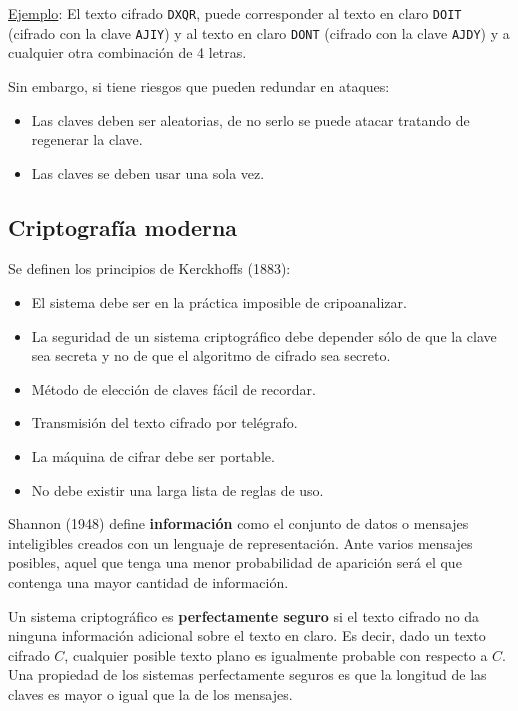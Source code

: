 \underline{Ejemplo}: El texto cifrado \texttt{DXQR}, puede corresponder al texto en claro \texttt{DOIT} (cifrado con la clave \texttt{AJIY}) y al texto en claro \texttt{DONT} (cifrado con la clave \texttt{AJDY}) y a cualquier otra combinación de 4 letras. 

Sin embargo, si tiene riesgos que pueden redundar en ataques:
\begin{itemize}
	\item Las claves deben ser aleatorias, de no serlo se puede atacar tratando de regenerar la clave.
	\item Las claves se deben usar una sola vez.
\end{itemize}


\subsection{Criptografía moderna}


Se definen los principios de Kerckhoffs (1883):
\begin{itemize}
	\item El sistema debe ser en la práctica imposible de cripoanalizar.
	\item La seguridad de un sistema criptográfico debe depender sólo de que la clave sea secreta y no de que el algoritmo de cifrado sea secreto.
	\item Método de elección de claves fácil de recordar.
	\item Transmisión del texto cifrado por telégrafo.
	\item La máquina de cifrar debe ser portable.
	\item No debe existir una larga lista de reglas de uso.
\end{itemize}

Shannon (1948) define \textbf{información} como el conjunto de datos o mensajes inteligibles creados con un lenguaje de representación. Ante varios mensajes posibles, aquel que tenga una menor probabilidad de aparición será el que contenga una mayor cantidad de información.

Un sistema criptográfico es \textbf{perfectamente seguro} si el texto cifrado no da ninguna información adicional sobre el texto en claro. Es decir, dado un texto cifrado $C$, cualquier posible texto plano es igualmente probable con respecto a $C$. Una propiedad de los sistemas perfectamente seguros es que la longitud de las claves es mayor o igual que la de los mensajes.

